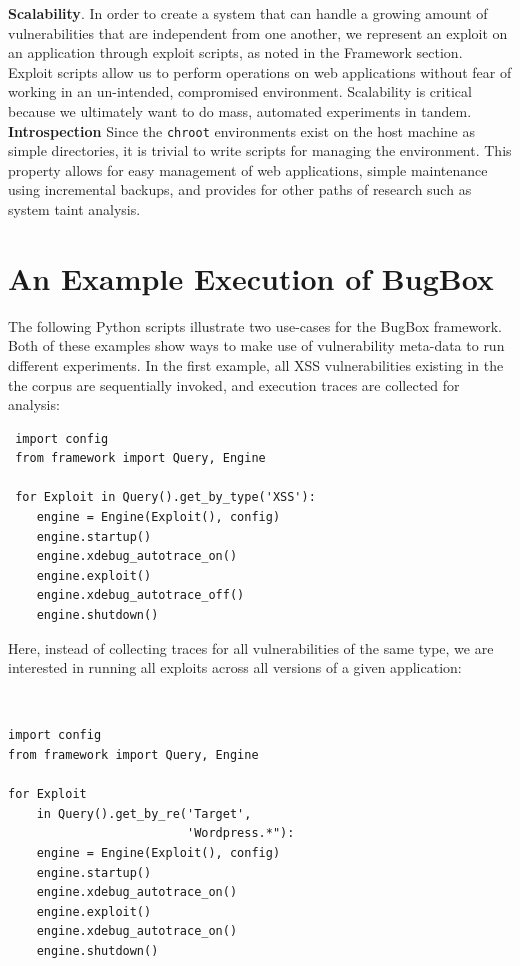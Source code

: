 \documentclass[letterpaper,twocolumn,10pt]{article}
\begin{document}
{\bf Scalability}.  In order to create a system that can handle a growing amount of vulnerabilities that are independent from one another, we represent an exploit on an application through exploit scripts, as noted in the Framework section.  Exploit scripts allow us to perform operations on web applications without fear of working in an un-intended, compromised environment.  Scalability is critical because we ultimately want to do mass, automated experiments in tandem. 
{\bf Introspection} Since the {\tt chroot} environments exist on the host machine as simple directories, it is trivial to write scripts for managing the environment. This property allows for easy management of web applications, simple maintenance using incremental backups, and provides for other paths of research such as system taint analysis.



\section {An Example Execution of BugBox}

The following Python scripts illustrate two use-cases for the BugBox framework. Both of these examples show ways to make use of vulnerability meta-data to run different experiments. In the first example, all XSS vulnerabilities existing in the the corpus are sequentially invoked, and execution traces are collected for analysis:

\begin{minipage}{\textwidth}
{\tt \footnotesize

\begin{lstlisting}
 import config
 from framework import Query, Engine
 
 for Exploit in Query().get_by_type('XSS'):
    engine = Engine(Exploit(), config)
    engine.startup()
    engine.xdebug_autotrace_on()
    engine.exploit()
    engine.xdebug_autotrace_off()
    engine.shutdown()
\end{lstlisting}
}
\end{minipage}


Here, instead of collecting traces for all vulnerabilities of the same type, we are interested in running all exploits across all versions of a given application:

\begin{minipage}{\textwidth}
{\tt \footnotesize
\begin{lstlisting}
import config
from framework import Query, Engine

for Exploit 
    in Query().get_by_re('Target', 
                         'Wordpress.*"):
    engine = Engine(Exploit(), config)
    engine.startup()
    engine.xdebug_autotrace_on()
    engine.exploit()
    engine.xdebug_autotrace_on()
    engine.shutdown()
\end{lstlisting}
}
\end{minipage}
\end{document}
